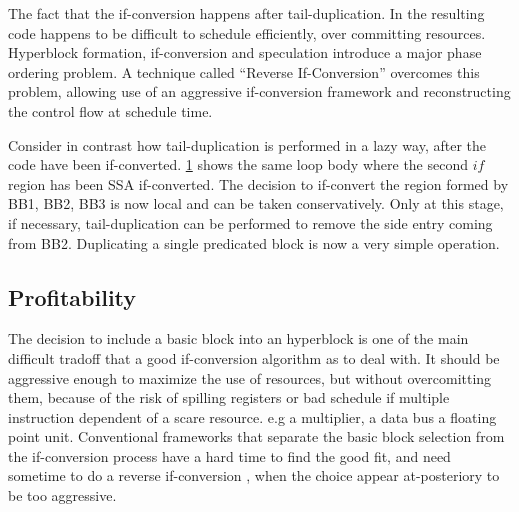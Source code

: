 \begin{figure}[h]
{    \label{fig:hyper4}}
\end{figure}

The fact that the if-conversion happens after tail-duplication. In the resulting code happens to be difficult to schedule efficiently, over committing resources. Hyperblock formation, if-conversion and speculation introduce a major phase ordering problem. A technique called ``Reverse If-Conversion'' \cite{August:1999:PRI:326224.325595} overcomes this problem, allowing use of an aggressive if-conversion framework and reconstructing the control flow at schedule time.

Consider in contrast how tail-duplication is performed in a lazy way, after the code have been if-converted. \ref{fig:hyper4} shows the same loop body where the second $if$ region has been SSA if-converted. The decision to if-convert the region formed by {BB1, BB2, BB3} is now local and can be taken conservatively. Only at this stage, if necessary, tail-duplication can be performed to remove the side entry coming from BB2. Duplicating a single predicated block is now a very simple operation.

\subsection{Profitability}

The decision to include a basic block into an hyperblock is one of the main difficult tradoff that a good if-conversion algorithm as to deal with. It should be aggressive enough to maximize the use of resources, but without overcomitting them, because of the risk of spilling registers or bad schedule if multiple instruction dependent of a scare resource. e.g a multiplier, a data bus a floating point unit. Conventional frameworks that separate the basic block selection from the if-conversion process have a hard time to find the good fit, and need sometime to do a reverse if-conversion \cite{August:1999:PRI:326224.325595}, when the choice appear at-posteriory to be too aggressive.

